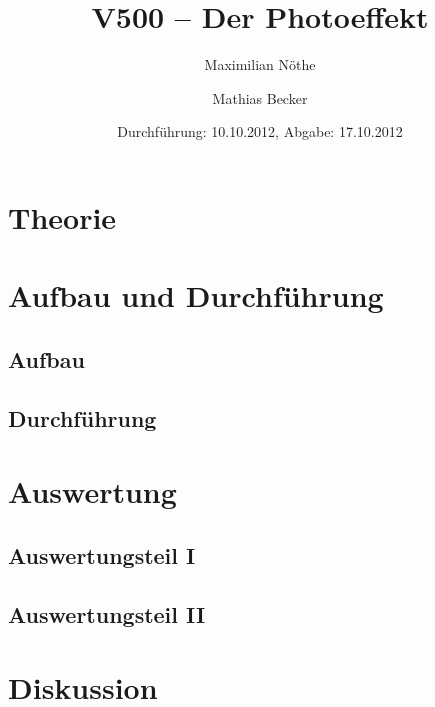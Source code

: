 \documentclass[
  titlepage=firstiscover,
]{scrartcl}
\title{V500 – Der Photoeffekt}
\author{Maximilian Nöthe \and Mathias Becker}
\date{Durchführung: 10.10.2012, Abgabe: 17.10.2012}
\begin{document}
\maketitle
\tableofcontents
\newpage

\section{Theorie}

\section{Aufbau und Durchführung}

\subsection{Aufbau}
\subsection{Durchführung}

\section{Auswertung}

\subsection{Auswertungsteil I}
\subsection{Auswertungsteil II}

\section{Diskussion}
\end{document}
